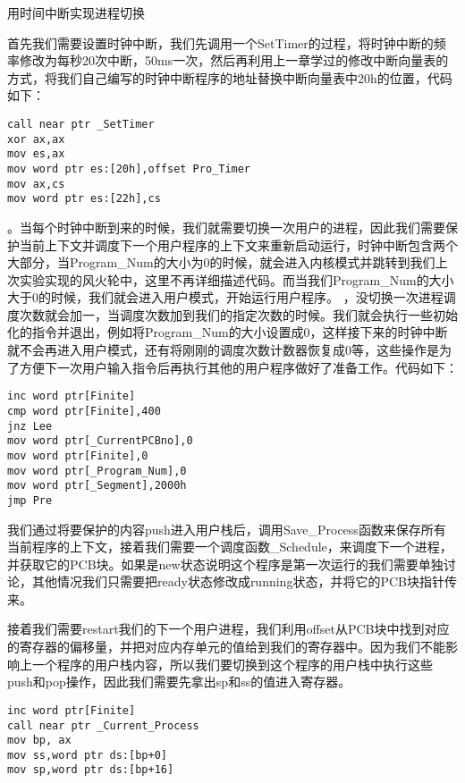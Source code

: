 \documentclass[UTF8]{article}
\newcommand{\bg}{\colorbox{gray!13}}%
\begin{document}
\begin{enumerate}[1)]
{\bfseries\item 用时间中断实现进程切换}
\par 首先我们需要设置时钟中断，我们先调用一个\bg{SetTimer}的过程，将时钟中断的频率修改为每秒20次中断，50ms一次，然后再利用上一章学过的修改中断向量表的方式，将我们自己编写的时钟中断程序的地址替换中断向量表中20h的位置，代码如下：
\begin{lstlisting}[language={[x86masm]Assembler}]
call near ptr _SetTimer
xor ax,ax
mov es,ax
mov word ptr es:[20h],offset Pro_Timer 
mov ax,cs
mov word ptr es:[22h],cs
\end{lstlisting}
。当每个时钟中断到来的时候，我们就需要切换一次用户的进程，因此我们需要保护当前上下文并调度下一个用户程序的上下文来重新启动运行，时钟中断包含两个大部分，当\bg{Program\_Num}的大小为0的时候，就会进入内核模式并跳转到我们上次实验实现的风火轮中，这里不再详细描述代码。而当我们\bg{Program\_Num}的大小大于0的时候，我们就会进入用户模式，开始运行用户程序。
，没切换一次进程调度次数就会加一，当调度次数加到我们的指定次数的时候。我们就会执行一些初始化的指令并退出，例如将\bg{Program\_Num}的大小设置成0，这样接下来的时钟中断就不会再进入用户模式，还有将刚刚的调度次数计数器恢复成0等，这些操作是为了方便下一次用户输入指令后再执行其他的用户程序做好了准备工作。代码如下：
\begin{lstlisting}[language={[x86masm]Assembler}]inc word ptr[Finite]
cmp word ptr[Finite],400
jnz Lee
mov word ptr[_CurrentPCBno],0
mov word ptr[Finite],0
mov word ptr[_Program_Num],0
mov word ptr[_Segment],2000h
jmp Pre
\end{lstlisting}
\par 我们通过将要保护的内容push进入用户栈后，调用\bg{Save\_Process}函数来保存所有当前程序的上下文，接着我们需要一个调度函数\bg{\_Schedule}，来调度下一个进程，并获取它的PCB块。如果是new状态说明这个程序是第一次运行的我们需要单独讨论，其他情况我们只需要把ready状态修改成running状态，并将它的PCB块指针传来。
\par 接着我们需要restart我们的下一个用户进程，我们利用offset从PCB块中找到对应的寄存器的偏移量，并把对应内存单元的值给到我们的寄存器中。因为我们不能影响上一个程序的用户栈内容，所以我们要切换到这个程序的用户栈中执行这些push和pop操作，因此我们需要先拿出sp和ss的值进入寄存器。
\begin{lstlisting}[language={[x86masm]Assembler}]
inc word ptr[Finite]
call near ptr _Current_Process 
mov bp, ax
mov ss,word ptr ds:[bp+0]
mov sp,word ptr ds:[bp+16]  	
\end{lstlisting}

\end{enumerate}
\end{document}
